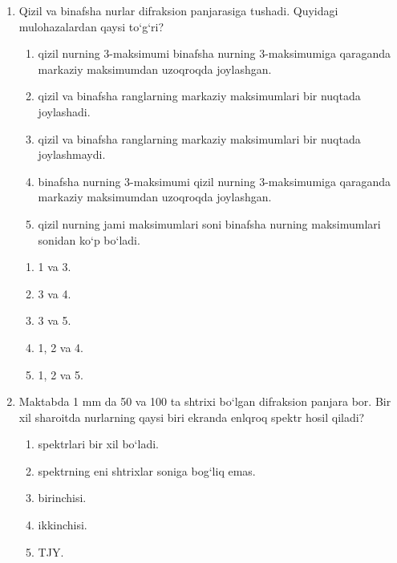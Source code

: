 \begin{enumerate}




\begin{enumerate}[label=\Alph*)]
\item 292.
\item 347.
\item 520.
\item 585.
\item 1040.
\end{enumerate}

\item Qizil va binafsha nurlar difraksion panjarasiga tushadi. Quyidagi mulohazalardan qaysi to‘g‘ri?
\begin{enumerate}
\item[1] qizil nurning 3-maksimumi binafsha nurning 3-maksimumiga qaraganda markaziy maksimumdan uzoqroqda joylashgan.
\item[2] qizil va binafsha ranglarning markaziy maksimumlari bir nuqtada joylashadi.
\item[3] qizil va binafsha ranglarning markaziy maksimumlari bir nuqtada joylashmaydi.
\item[4] binafsha nurning 3-maksimumi qizil nurning 3-maksimumiga qaraganda markaziy maksimumdan uzoqroqda joylashgan.
\item[5] qizil nurning jami maksimumlari soni binafsha nurning maksimumlari sonidan ko‘p bo‘ladi.
\end{enumerate}
\begin{enumerate}[label=\Alph*)]
\item 1 va 3.
\item 3 va 4.
\item 3 va 5.
\item 1, 2 va 4.
\item 1, 2 va 5.
\end{enumerate}

\item Maktabda 1 mm da 50 va 100 ta shtrixi bo‘lgan difraksion panjara bor. Bir xil sharoitda nurlarning qaysi biri ekranda enlqroq spektr hosil qiladi?
\begin{enumerate}[label=\Alph*)]
\item spektrlari bir xil bo‘ladi.
\item spektrning eni shtrixlar soniga bog‘liq emas.
\item birinchisi.
\item ikkinchisi.
\item TJY.
\end{enumerate}


\end{enumerate}
